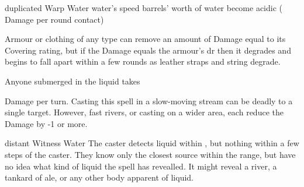   {duplicated}%
  {Warp}%
  {Water}%
  {water's speed}%
  { barrels' worth of water become acidic ( Damage per round contact)}%
  {
    Armour or clothing of any type can remove an amount of Damage equal to its Covering rating, but if the Damage equals the armour's \gls{dr} then it degrades and begins to fall apart within a few rounds as leather straps and string degrade.

    Anyone submerged in the liquid takes \addtocounter{spellCost}{2}  Damage per turn.
    Casting this spell in a slow-moving stream can be deadly to a single target.
    However, fast rivers, or casting on a wider area, each reduce the Damage by -1 or more.
  }

  {distant}%
  {Witness}%
  {Water}%
  {}%
  {The caster detects liquid within \spellRange, but nothing within a few steps of the caster.
    They know only the closest source within the range, but have no idea what kind of liquid the spell has revealled.}%
  {It might reveal a river, a tankard of ale, or any other body apparent of liquid.}
